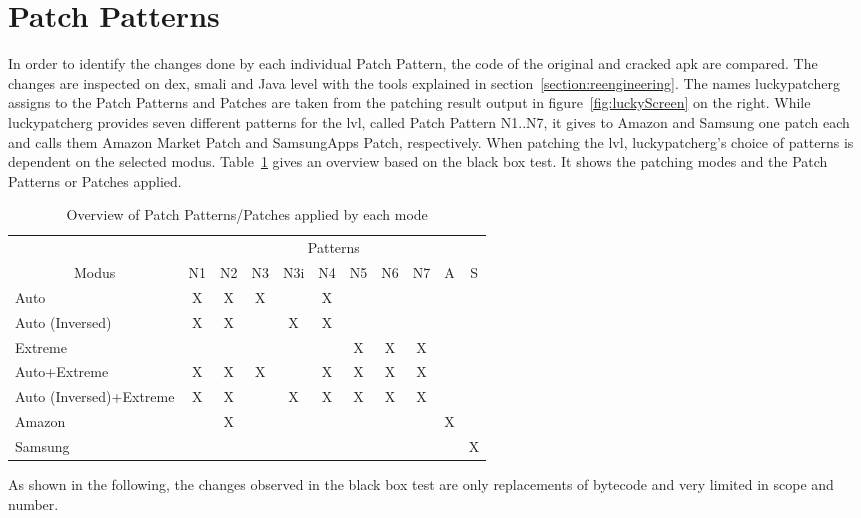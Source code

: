 \section{Patch Patterns} \label{section:luckypatcher-patterns}
In order to identify the changes done by each individual Patch Pattern, the code of the original and cracked \gls{apk} are compared.
The changes are inspected on dex, smali and Java level with the tools explained in section~\ref{section:reengineering}.
\newline
The names \gls{luckypatcherg} assigns to the Patch Patterns and Patches are taken from the patching result output in figure~\ref{fig:luckyScreen} on the right.
While \gls{luckypatcherg} provides seven different patterns for the \gls{lvl}, called Patch Pattern N1..N7, it gives to Amazon and Samsung one patch each and calls them Amazon Market Patch and SamsungApps Patch, respectively.
\newline
When patching the \gls{lvl}, \gls{luckypatcherg}’s choice of patterns is dependent on the selected modus.
Table~\ref{table:patterns} gives an overview based on the black box test.
It shows the patching modes and the Patch Patterns or Patches applied.
\newline
\begin{table}[h]
\centering
\begin{tabular}{l|cccccccccc}
                           & \multicolumn{10}{c}{Patterns}           \\
\multicolumn{1}{c|}{Modus} & N1 & N2 & N3 & N3i & N4 & N5 & N6 & N7 & A & S \\ \hline
Auto                       & X  & X  & X  &     & X  &    &    &  &&  \\
Auto (Inversed)            & X  & X  &    & X   & X  &    &    &  &&  \\
Extreme                    &    &    &    &     &    & X  & X  & X && \\
Auto+Extreme               & X  & X  & X  &     & X  & X  & X  & X && \\
Auto (Inversed)+Extreme    & X  & X  &    & X   & X  & X  & X  &X &&\\
Amazon               &   &  X&   &     &   &   &   &  &X&\\
Samsung               &   &   &   &     &   &   &   &   &&X
\end{tabular}
\caption{Overview of Patch Patterns/Patches applied by each mode}
\label{table:patterns}
\end{table}
As shown in the following, the changes observed in the black box test are only replacements of bytecode and very limited in scope and number.
